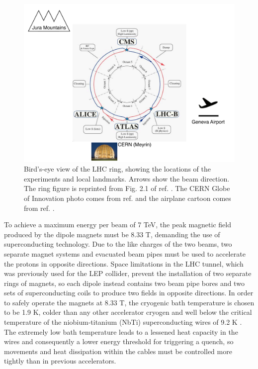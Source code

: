 \documentclass[dissertation.tex]{subfiles}
\begin{document}
\begin{figure}
	\centering
	\includegraphics[scale=0.3]{LHC_layout}
	\caption{Bird's-eye view of the LHC ring, showing the locations of the experiments and local landmarks.  Arrows show the beam direction.  The ring figure is reprinted from Fig. 2.1 of ref. \cite{1748-0221-3-08-S08001}.  The CERN Globe of Innovation photo comes from ref. \cite{CERN_Globe} and the airplane cartoon comes from ref. \cite{airplane}.}
	\label{fig:LHC_layout}
\end{figure}

To achieve a maximum energy per beam of 7 TeV, the peak magnetic field produced by the dipole magnets must be 8.33 T, demanding the use of superconducting technology.  Due to the like charges of the two beams, two separate magnet systems and evacuated beam pipes must be used to accelerate the protons in opposite directions.  Space limitations in the LHC tunnel, which was previously used for the LEP collider, prevent the installation of two separate rings of magnets, so each dipole instead contains two beam pipe bores and two sets of superconducting coils to produce two fields in opposite directions.  In order to safely operate the magnets at 8.33 T, the cryogenic bath temperature is chosen to be 1.9 K, colder than any other accelerator cryogen and well below the critical temperature of the niobium-titanium (NbTi) superconducting wires of 9.2 K \cite{Flukiger}.  The extremely low bath temperature leads to a lessened heat capacity in the wires and consequently a lower energy threshold for triggering a quench, so movements and heat dissipation within the cables must be controlled more tightly than in previous accelerators.
\end{document}
